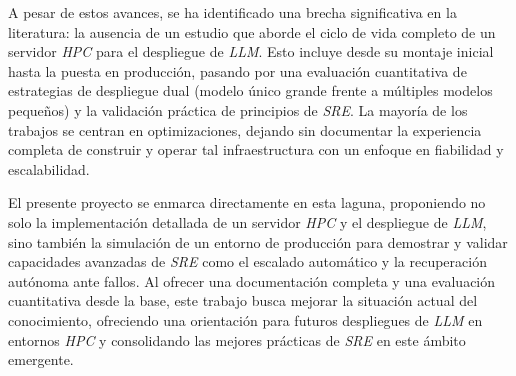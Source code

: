 A pesar de estos avances, se ha identificado una brecha significativa en la literatura: la ausencia de un estudio que aborde el ciclo de vida completo de un servidor \textit{HPC} para el despliegue de \textit{LLM}. Esto incluye desde su montaje inicial hasta la puesta en producción, pasando por una evaluación cuantitativa de estrategias de despliegue dual (modelo único grande frente a múltiples modelos pequeños) y la validación práctica de principios de \textit{SRE}. La mayoría de los trabajos se centran en optimizaciones, dejando sin documentar la experiencia completa de construir y operar tal infraestructura con un enfoque en fiabilidad y escalabilidad.

El presente proyecto se enmarca directamente en esta laguna, proponiendo no solo la implementación detallada de un servidor \textit{HPC} y el despliegue de \textit{LLM}, sino también la simulación de un entorno de producción para demostrar y validar capacidades avanzadas de \textit{SRE} como el escalado automático y la recuperación autónoma ante fallos. Al ofrecer una documentación completa y una evaluación cuantitativa desde la base, este trabajo busca mejorar la situación actual del conocimiento, ofreciendo una orientación para futuros despliegues de \textit{LLM} en entornos \textit{HPC} y consolidando las mejores prácticas de \textit{SRE} en este ámbito emergente.



